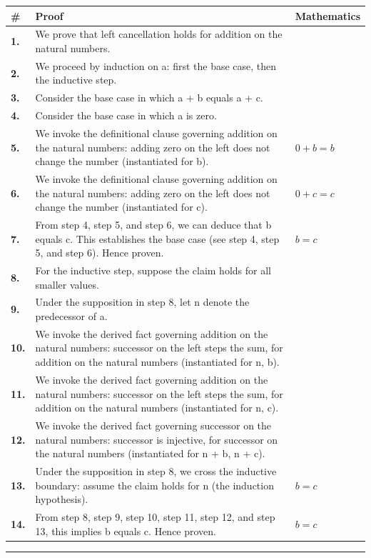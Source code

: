 \documentclass[11pt]{article}
\theoremstyle{definition}
\begin{document}
\begin{tabular}{@{} >{\raggedright\arraybackslash}p{} >{\raggedright\arraybackslash}p{} >{\raggedleft\arraybackslash}p{} @{}}
\textbf{\#} & \textbf{Proof} & \textbf{Mathematics} \\
\midrule
\textbf{1.} & We prove that left cancellation holds for addition on the natural numbers. & \\[0.45em]
\textbf{2.} & We proceed by induction on a: first the base case, then the inductive step. & \\[0.45em]
\textbf{3.} & Consider the base case in which a + b  equals  a + c. & \\[0.45em]
\textbf{4.} & Consider the base case in which a is zero. & \\[0.45em]
\textbf{5.} & We invoke the definitional clause governing addition on the natural numbers: adding zero on the left does not change the number (instantiated for b). & $\displaystyle 0 + b = b$ \\[0.45em]
\textbf{6.} & We invoke the definitional clause governing addition on the natural numbers: adding zero on the left does not change the number (instantiated for c). & $\displaystyle 0 + c = c$ \\[0.45em]
\textbf{7.} & From step 4, step 5, and step 6, we can deduce that b equals c. This establishes the base case (see step 4, step 5, and step 6). Hence proven. & $\displaystyle b = c$ \\[0.45em]
\textbf{8.} & For the inductive step, suppose the claim holds for all smaller values. & \\[0.45em]
\textbf{9.} & Under the supposition in step 8, let n denote the predecessor of a. & \\[0.45em]
\textbf{10.} & We invoke the derived fact governing addition on the natural numbers: successor on the left steps the sum, for addition on the natural numbers (instantiated for n, b). & \\[0.45em]
\textbf{11.} & We invoke the derived fact governing addition on the natural numbers: successor on the left steps the sum, for addition on the natural numbers (instantiated for n, c). & \\[0.45em]
\textbf{12.} & We invoke the derived fact governing successor on the natural numbers: successor is injective, for successor on the natural numbers (instantiated for n + b, n + c). & \\[0.45em]
\textbf{13.} & Under the supposition in step 8, we cross the inductive boundary: assume the claim holds for n (the induction hypothesis). & $\displaystyle b = c$ \\[0.45em]
\textbf{14.} & From step 8, step 9, step 10, step 11, step 12, and step 13, this implies b equals c. Hence proven. & $\displaystyle b = c$ \\[0.45em]
\bottomrule
\end{tabular}
\label{thm:Nat-addition-left_cancellation_holds}
\par\medskip\hrule
\end{document}
